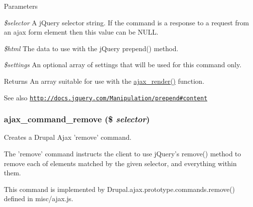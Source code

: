 \begin{DoxyParams}{Parameters}
\item[{\em \$selector}]A jQuery selector string. If the command is a response to a request from an ajax form element then this value can be NULL. \item[{\em \$html}]The data to use with the jQuery prepend() method. \item[{\em \$settings}]An optional array of settings that will be used for this command only.\end{DoxyParams}
\begin{DoxyReturn}{Returns}
An array suitable for use with the \hyperlink{group__ajax_ga241c2426bdde049c55b05b7bf5d714a2}{ajax\_\-render()} function.
\end{DoxyReturn}
\begin{DoxySeeAlso}{See also}
\href{http://docs.jquery.com/Manipulation/prepend#content}{\tt http://docs.jquery.com/Manipulation/prepend\#content} 
\end{DoxySeeAlso}
\hypertarget{group__ajax__commands_gadd65f6f231cc96812c810c54e36d9011}{
\subsubsection[{ajax\_\-command\_\-remove}]{\setlength{\rightskip}{0pt plus 5cm}ajax\_\-command\_\-remove (\$ {\em selector})}}
\label{group__ajax__commands_gadd65f6f231cc96812c810c54e36d9011}
Creates a Drupal Ajax 'remove' command.

The 'remove' command instructs the client to use jQuery's remove() method to remove each of elements matched by the given selector, and everything within them.

This command is implemented by Drupal.ajax.prototype.commands.remove() defined in misc/ajax.js.


